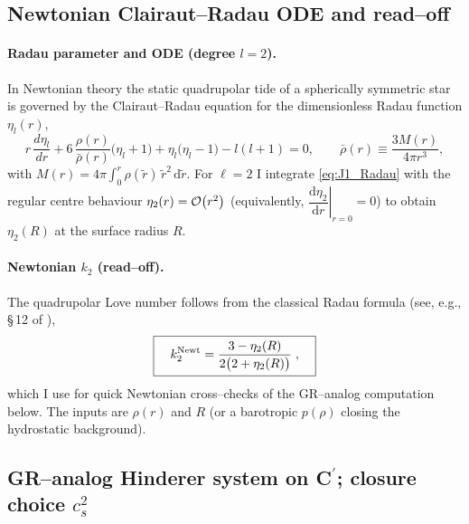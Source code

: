\documentclass{iopjournal}
\begin{document}
\subsection{Newtonian Clairaut–Radau ODE and read–off}\label{app:J1}
\paragraph{Radau parameter and ODE (degree $l=2$).}
In Newtonian theory the static quadrupolar tide of a spherically symmetric star is governed by the Clairaut–Radau equation for the dimensionless Radau function $\eta_l(r)$,
\begin{equation}
r\,\frac{d\eta_l}{dr}
+6\,\frac{\rho(r)}{\bar\rho(r)}\big(\eta_l+1\big)
+\eta_l\big(\eta_l-1\big)
-l(l+1)=0,
\qquad
\bar\rho(r)\equiv \frac{3M(r)}{4\pi r^3},
\label{eq:J1_Radau}
\end{equation}
with \(M(r)=4\pi\!\int_{0}^{r}\rho(\tilde{r})\,\tilde{r}^{2}\,\mathrm{d}\tilde{r}\).
For \(\ell=2\) I integrate \eqref{eq:J1_Radau} with the regular centre behaviour
\(\eta_{2}(r)=\order{r^{2}}\) (equivalently,
\(\left.\dfrac{\mathrm{d}\eta_{2}}{\mathrm{d}r}\right|_{r=0}=0\))
to obtain \(\eta_{2}(R)\) at the surface radius \(R\).


\paragraph{Newtonian $k_2$ (read–off).}
The quadrupolar Love number follows from the classical Radau formula (see, e.g., \S\,12 of \cite{PoissonWill2014}),
\begin{equation}
\boxed{\quad
k_2^{\rm Newt}
=\frac{3-\eta_2(R)}{2\big(2+\eta_2(R)\big)}\;,
\quad}
\label{eq:J1_k2_Newt}
\end{equation}
which I use for quick Newtonian cross–checks of the GR–analog computation below. The inputs are $\rho(r)$ and $R$ (or a barotropic $p(\rho)$ closing the hydrostatic background).

\subsection{\texorpdfstring
  {GR–analog Hinderer system on C$^\prime$; closure choice $c_s^2$}
  {GR–analog Hinderer system on C'; closure choice cs2}}
\label{app:J2}
\end{document}
